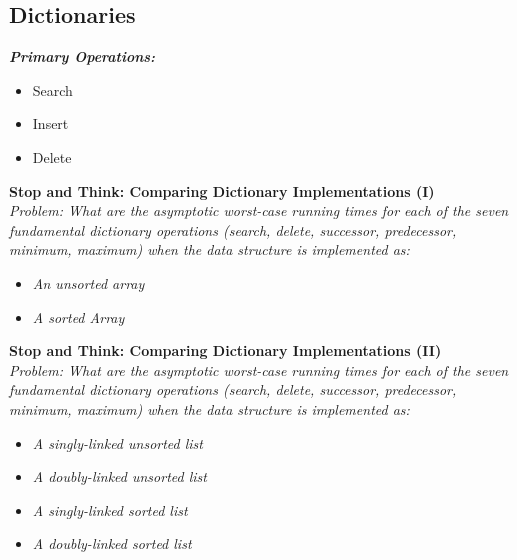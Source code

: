 \subsection{Dictionaries}

\textbf{\emph{Primary Operations:}}

\begin{itemize}
	\item Search
	\item Insert
	\item Delete
\end{itemize}

\textbf{Stop and Think: Comparing Dictionary Implementations (I)} \\

\emph{Problem: What are the asymptotic worst-case running times for each of the seven fundamental dictionary operations (search, delete, successor, predecessor, minimum, maximum) when the data structure is implemented as:}\\

\begin{itemize}
	\item \emph{An unsorted array}
	\item \emph{A sorted Array}
\end{itemize}

\noindent{}

\textbf{Stop and Think: Comparing Dictionary Implementations (II)} \\

\emph{Problem: What are the asymptotic worst-case running times for each of the seven fundamental dictionary operations (search, delete, successor, predecessor, minimum, maximum) when the data structure is implemented as:}\\

\begin{itemize}
	\item \emph{A singly-linked unsorted list}
	\item \emph{A doubly-linked unsorted list}
	\item \emph{A singly-linked sorted list}
	\item \emph{A doubly-linked sorted list}
\end{itemize}